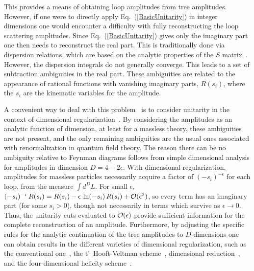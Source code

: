 \documentclass[12pt]{livrev}
\begin{document}
This provides a means of obtaining loop amplitudes from tree
amplitudes.  However, if one were to directly apply
Eq.~(\ref{BasicUnitarity}) in integer dimensions one would encounter a
difficulty with fully reconstructing the loop scattering amplitudes.
Since Eq.~(\ref{BasicUnitarity}) gives only the imaginary part one
then needs to reconstruct the real part.  This is traditionally done
via dispersion relations, which are based on the analytic properties of
the $S$ matrix~\cite{Mandelstam58,Landau59,Mandelstam59,Cutkosky60}.
However, the dispersion integrals do not generally converge. This
leads to a set of subtraction ambiguities in the real part.  These
ambiguities are related to the appearance of rational functions with
vanishing imaginary parts, $R(s_{i})$, where the $s_{i}$ are the
kinematic variables for the amplitude.

A convenient way to deal with this
problem~\cite{Bern94SusyFour,Bern95SusyFour,BernMorgan,Review,Rozowsky}
is to consider unitarity in the context of dimensional
regularization~\cite{HV,vanNeerven}.  By considering the amplitudes as
an analytic function of dimension, at least for a massless theory,
these ambiguities are not present, and the only remaining ambiguities
are the usual ones associated with renormalization in quantum field
theory.  The reason there can be no ambiguity relative to Feynman
diagrams follows from simple dimensional analysis for amplitudes in
dimension $D=4-2 \epsilon$.  With dimensional regularization,
amplitudes for massless particles necessarily acquire a factor of
$(-s_{i})^{-\epsilon}$ for each loop, from the measure $\int d^DL$.
For small $\epsilon$, $(-s_{i})^{-\epsilon} \, R(s_{i}) = R(s_{i}) -
\epsilon \, \ln (-s_{i}) \, R(s_{i}) + {\cal O}(\epsilon^2)$, so every
term has an imaginary part (for some $s_{i}>0$), though not
necessarily in terms which survive as $\epsilon\rightarrow 0$.  Thus,
the unitarity cuts evaluated to ${\cal O}(\epsilon)$ provide
sufficient information for the complete reconstruction of an
amplitude.  Furthermore, by adjusting the specific rules for the
analytic continuation of the tree amplitudes to $D$-dimensions one can
obtain results in the different varieties of dimensional
regularization, such as the conventional one~\cite{CollinsBook}, the
t'~Hooft-Veltman scheme~\cite{HV}, dimensional
reduction~\cite{Siegel79DR}, and the four-dimensional helicity
scheme~\cite{Long,TwoloopFDH}.
\end{document}
